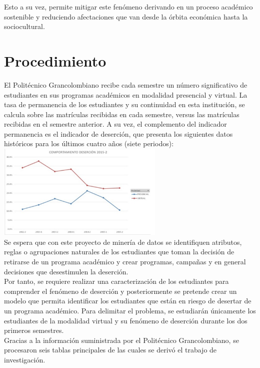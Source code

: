 \documentclass[fleqn,10pt]{SelfArx} %
\begin{document}
Esto a su vez, permite mitigar este fenómeno derivando en un proceso académico sostenible y reduciendo afectaciones que van desde la órbita económica hasta la sociocultural.\\


\section{Procedimiento}

El Politécnico Grancolombiano recibe cada semestre un número significativo de estudiantes en sus programas académicos en modalidad presencial y virtual. 
La tasa de permanencia de los estudiantes y su continuidad en esta institución, se calcula sobre las matrículas recibidas en cada semestre, versus las matrículas recibidas en el semestre anterior. A su vez, el complemento del indicador permanencia es el indicador de deserción, que presenta los siguientes datos históricos para los últimos cuatro años (siete periodos):  \\

\includegraphics[width=8cm]{img/estadistica.jpg}\\ 

Se espera que con este proyecto de minería de datos se identifiquen atributos, reglas o agrupaciones naturales de los estudiantes que toman la decisión de retirarse de un programa académico y crear programas, campañas y en general decisiones que desestimulen la deserción. \\

Por tanto, se requiere realizar una caracterización de los estudiantes para comprender el fenómeno de deserción y posteriormente se pretende crear un modelo que permita identificar los estudiantes que están en riesgo de desertar de un programa académico. Para delimitar el problema, se estudiarán únicamente los estudiantes de la modalidad virtual y su fenómeno de deserción durante los dos primeros semestres. \\
Gracias a la información suministrada por el Politécnico Grancolombiano, se procesaron seis tablas principales de las cuales se derivó el trabajo de investigación.\\
\end{document}
